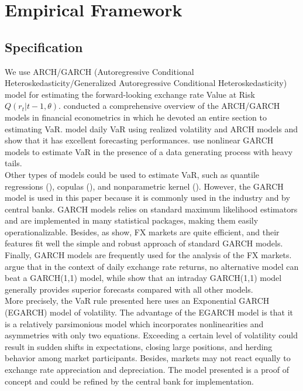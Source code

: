 \documentclass[11pt]{article}
\begin{document}
\section{Empirical Framework}
\label{sec:empirical-framework}

\subsection{Specification}
\label{sec:specification}

We use  ARCH/GARCH (Autoregressive  Conditional Heteroskedasticity/Generalized
Autoregressive  Conditional  Heteroskedasticity)   model  for  estimating  the
forward-looking   exchange   rate   Value  at   Risk   $Q(r_t|   t-1,\theta)$.
\cite{engle2001} conducted  a comprehensive overview of  the ARCH/GARCH models
in financial econometrics in which he  devoted an entire section to estimating
VaR. \cite{giot2004} model daily VaR using realized volatility and ARCH models
and show that  it has excellent forecasting  performances. \cite{chan2007} use
nonlinear GARCH  models to estimate VaR  in the presence of  a data generating
process with heavy tails.\\

Other  types  of models  could  be  used to  estimate  VaR,  such as  quantile
regressions   (\cite{gaglianone2011}),    copulas   (\cite{patton2001}),   and
nonparametric kernel  (\cite{hoogerheide2010}).  However,  the GARCH  model is
used in this paper because it is  commonly used in the industry and by central
banks. GARCH models  relies on standard maximum likelihood  estimators and are
implemented    in   many    statistical   packages,    making   them    easily
operationalizable.   Besides, as  \cite{jeon2002} show,  FX markets  are quite
efficient,  and their  features fit  well the  simple and  robust approach  of
standard  GARCH models.   Finally, GARCH  models are  frequently used  for the
analysis of  the FX markets.  \cite{hansen2005}  argue that in the  context of
daily exchange rate returns, no alternative model can beat a GARCH(1,1) model,
while  \cite{mcmillan2012} show  that an  intraday GARCH(1,1)  model generally
provides superior forecasts compared with all other models.\\

More precisely, the VaR rule presented here uses an Exponential GARCH (EGARCH)
model  of volatility.   The advantage  of the  EGARCH model  is that  it is  a
relatively   parsimonious   model   which  incorporates   nonlinearities   and
asymmetries with only  two equations. Exceeding a certain  level of volatility
could result  in sudden shifts  in expectations, closing large  positions, and
herding behavior  among market  participants. Besides,  markets may  not react
equally to exchange rate appreciation and depreciation. The model presented is
a  proof   of  concept  and  could   be  refined  by  the   central  bank  for
implementation.\\
\end{document}
